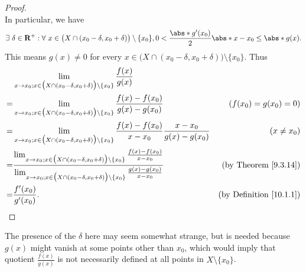 \begin{proof}
\[    \]
    In particular, we have
    \[
        \exists\ \delta \in \mathbf{R}^+ : \forall\ x \in \big(X \cap (x_0 - \delta, x_0 + \delta)\big) \setminus \{x_0\}, 0 < \frac{\abs*{g'(x_0)}}{2} \abs*{x - x_0} \leq \abs*{g(x)}.
    \]
    This means \(g(x) \neq 0\) for every \(x \in \big(X \cap (x_0 - \delta, x_0 + \delta)\big) \setminus \{x_0\}\).
    Thus
    \begin{align*}
          & \lim_{x \to x_0 ; x \in \big(X \cap (x_0 - \delta, x_0 + \delta)\big) \setminus \{x_0\}} \frac{f(x)}{g(x)}                                                                                                                                                                                  \\
        = & \lim_{x \to x_0 ; x \in \big(X \cap (x_0 - \delta, x_0 + \delta)\big) \setminus \{x_0\}} \frac{f(x) - f(x_0)}{g(x) - g(x_0)}                                                                                                                          & (f(x_0) = g(x_0) = 0)               \\
        = & \lim_{x \to x_0 ; x \in \big(X \cap (x_0 - \delta, x_0 + \delta)\big) \setminus \{x_0\}} \frac{f(x) - f(x_0)}{x - x_0} \frac{x - x_0}{g(x) - g(x_0)}                                                                                                  & (x \neq x_0)                        \\
        = & \frac{\lim_{x \to x_0 ; x \in \big(X \cap (x_0 - \delta, x_0 + \delta)\big) \setminus \{x_0\}} \frac{f(x) - f(x_0)}{x - x_0}}{\lim_{x \to x_0 ; x \in \big(X \cap (x_0 - \delta, x_0 + \delta)\big) \setminus \{x_0\}} \frac{g(x) - g(x_0)}{x - x_0}} & \text{(by Theorem \ref{9.3.14})}    \\
        = & \frac{f'(x_0)}{g'(x_0)}.                                                                                                                                                                                                                              & \text{(by Definition \ref{10.1.1})}
    \end{align*}
\end{proof}

\begin{note}
    The presence of the \(\delta\) here may seem somewhat strange, but is needed because \(g(x)\) might vanish at some points other than \(x_0\), which would imply that quotient \(\frac{f(x)}{g(x)}\) is not necessarily defined at all points in \(X \setminus \{x_0\}\).
\end{note}

